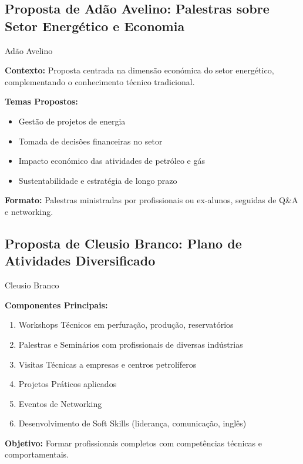 \documentclass[12pt,a4paper,oneside]{article}
\begin{document}
\subsection{Proposta de Adão Avelino: Palestras sobre Setor Energético e Economia}

\begin{proposalbox}{Adão Avelino}

\textbf{Contexto:} Proposta centrada na dimensão económica do setor energético, complementando o conhecimento técnico tradicional.

\medskip

\textbf{Temas Propostos:}
\begin{itemize}[label={\color{spe-secondary}▸}]
  \item Gestão de projetos de energia
  \item Tomada de decisões financeiras no setor
  \item Impacto económico das atividades de petróleo e gás
  \item Sustentabilidade e estratégia de longo prazo
\end{itemize}

\medskip

\textbf{Formato:} Palestras ministradas por profissionais ou ex-alunos, seguidas de Q\&A e networking.

\end{proposalbox}

\vspace{1.2cm}

\subsection{Proposta de Cleusio Branco: Plano de Atividades Diversificado}

\begin{proposalbox}{Cleusio Branco}

\textbf{Componentes Principais:}

\begin{enumerate}[label={\color{spe-accent}\arabic*}]
  \item Workshops Técnicos em perfuração, produção, reservatórios
  \item Palestras e Seminários com profissionais de diversas indústrias
  \item Visitas Técnicas a empresas e centros petrolíferos
  \item Projetos Práticos aplicados
  \item Eventos de Networking
  \item Desenvolvimento de Soft Skills (liderança, comunicação, inglês)
\end{enumerate}

\textbf{Objetivo:} Formar profissionais completos com competências técnicas e comportamentais.

\end{proposalbox}
\end{document}
